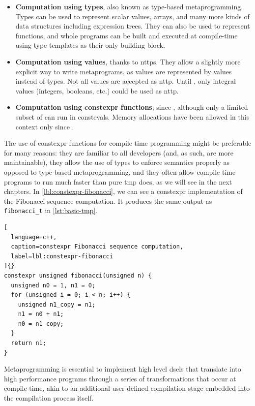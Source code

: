 \documentclass[../main]{subfiles}
\begin{document}
\begin{itemize}

  \item

\textbf{Computation using types}, also known as type-based metaprogramming.
Types can be used to represent scalar values, arrays, and many more
kinds of data structures including expression trees.
They can also be used to represent functions, and whole programs can be built
and executed at compile-time using type templates as their only building block.

  \item

\textbf{Computation using values}, thanks to \glspl{nttp}.
They allow a slightly more explicit way to write metaprograms,
as values are represented by values instead of types.
Not all values are accepted as \gls{nttp}.
Until , only integral values (\ie integers, booleans, etc.)
could be used as \gls{nttp}.

  \item

\textbf{Computation using \gls{constexpr} functions}, since ,
although only a limited subset of \cpp can run in \glspl{consteval}.
Memory allocations have been allowed in this context only since .

\end{itemize}

The use of \gls{constexpr} functions for compile time programming might be
preferable for many reasons: they are familiar to all \cpp developers
(and, as such, are more maintainable), they allow the use of types to enforce
semantics properly as opposed to type-based metaprogramming, and they often
allow compile time programs to run much faster than pure \gls{tmp} does,
as we will see in the next chapters. In \ref{lbl:constexpr-fibonacci},
we can see a \gls{constexpr} implementation of the Fibonacci sequence
computation. It produces the same output as \lstinline{fibonacci_t} in
\ref{lst:basic-tmp}.

\begin{lstlisting}[
  language=c++,
  caption=constexpr Fibonacci sequence computation,
  label=lbl:constexpr-fibonacci
]{}
constexpr unsigned fibonacci(unsigned n) {
  unsigned n0 = 1, n1 = 0;
  for (unsigned i = 0; i < n; i++) {
    unsigned n1_copy = n1;
    n1 = n0 + n1;
    n0 = n1_copy;
  }
  return n1;
}
\end{lstlisting}

Metaprogramming is essential to implement high level \glspl{dsel} that translate
into high performance programs through a series of transformations that
occur at compile-time, akin to an additional user-defined compilation stage
embedded into the compilation process itself.
\end{document}
